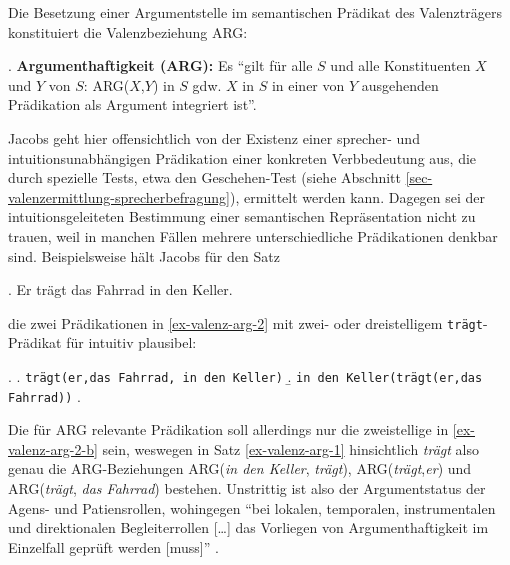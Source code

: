 Die Besetzung einer Argumentstelle im semantischen Prädikat des Valenzträgers konstituiert die Valenzbeziehung ARG:

\ex. {\bf Argumenthaftigkeit (ARG):} Es "`gilt für alle $S$ und alle Konstituenten $X$ und $Y$ von $S$: ARG($X$,$Y$) in $S$ gdw. $X$ in $S$ in einer von $Y$ ausgehenden Prädikation als Argument integriert ist"'. \citep[17]{Jacobs:94}

Jacobs geht hier offensichtlich von der Existenz einer sprecher- und intuitionsunabhängigen Prädikation einer konkreten Verbbedeutung aus, die durch spezielle Tests, etwa den Gesche\-hen-Test (siehe Abschnitt \ref{sec-valenzermittlung-sprecherbefragung}), ermittelt werden kann. Dagegen sei der intuitionsgeleiteten Bestimmung einer semantischen Repräsentation nicht zu trauen, weil in manchen Fällen mehrere unterschiedliche Prädikationen denkbar sind. Beispielsweise hält Jacobs für den Satz

\ex. Er trägt das Fahrrad in den Keller. \label{ex-valenz-arg-1}

die zwei Prädikationen in \ref{ex-valenz-arg-2} mit zwei- oder dreistelligem {\tt trägt}-Prädikat für intuitiv plausibel:

\ex. \label{ex-valenz-arg-2}
\a. {\tt trägt(er,das Fahrrad, in den Keller)}
\b. {\tt in den Keller(trägt(er,das Fahrrad))} \label{ex-valenz-arg-2-b}
\z. \citep[(6),(7)]{Jacobs:94}

Die für ARG relevante Prädikation soll allerdings nur die zweistellige in \ref{ex-valenz-arg-2-b} sein, weswegen in Satz \ref{ex-valenz-arg-1} hinsichtlich {\it trägt} also genau die ARG-Beziehungen ARG({\it in den Keller}, {\it trägt}), ARG({\it trägt},{\it er}) und ARG({\it trägt}, {\it das Fahrrad}) bestehen. Unstrittig ist also der Argumentstatus der Agens- und Patiensrollen, wohingegen "`bei lokalen, temporalen, instrumentalen und direktionalen Begleiterrollen [\ldots] das Vorliegen von Argumenthaftigkeit im Einzelfall geprüft werden [muss]"' \citep[768]{Storrer:03}.

